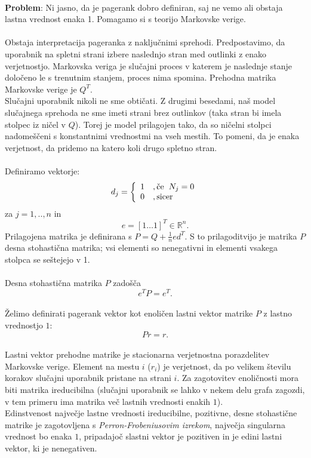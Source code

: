 \documentclass[a4paper]{article}
\begin{document}
\\ \textbf{Problem}: Ni jasno, da je pagerank dobro definiran, saj ne vemo ali obstaja lastna vrednost enaka 1. Pomagamo si s teorijo Markovske verige.\\
\\Obstaja interpretacija pageranka z naključnimi sprehodi. Predpostavimo, da uporabnik na spletni strani izbere naslednjo stran  med outlinki z enako verjetnostjo. Markovska veriga je slučajni proces v katerem je naslednje stanje določeno le s trenutnim stanjem, proces nima spomina. Prehodna matrika Markovske verige je $Q^T$.\\
Slučajni uporabnik nikoli ne sme obtičati. Z drugimi besedami, naš model slučajnega sprehoda ne sme imeti strani brez outlinkov (taka stran bi imela stolpec iz ničel v $Q$). Torej je model prilagojen tako, da so ničelni stolpci nadomeščeni s konstantnimi vrednostmi na vseh mestih. To pomeni, da je enaka verjetnost, da pridemo na katero koli drugo spletno stran. \\ 
\\Definiramo vektorje: \\
\[
d_j = 
\left \{
	\begin{array}{ll}
		1  &, \mbox{če}\hspace{2mm} N_j = 0 \\
		0 &, \mbox{sicer} 
	\end{array}
\right. \]
za $j = 1, .., n$ in
$$e = [1 … 1] ^T \in \mathbb{R}^n.$$
Prilagojena matrika je definirana s $ P = Q + \frac{1}{n}ed^T$. 
S to prilagoditvijo je matrika $P$ desna stohastična matrika; vsi elementi so nenegativni in elementi vsakega stolpca se seštejejo v 1. \\
\\Desna stohastična matrika $P$ zadošča 
$$e^TP = e^T.$$ \\
Želimo definirati pagerank vektor kot enoličen lastni vektor matrike $P$ z lastno vrednostjo $1$:
$$Pr=r.$$ \\
Lastni vektor prehodne matrike je stacionarna verjetnostna porazdelitev Markovske verige. Element na mestu $i$ ($r_i$) je verjetnost, da po velikem številu korakov slučajni uporabnik pristane na strani $i$. Za zagotovitev enoličnosti mora biti matrika ireducibilna (slučajni uporabnik se lahko v nekem delu grafa zagozdi, v tem primeru ima matrika več lastnih vrednosti enakih $1$). \\ Edinstvenost največje lastne vrednosti ireducibilne, pozitivne, desne stohastične matrike je zagotovljena s \textit{Perron-Frobeniusovim izrekom}, največja singularna vrednost bo enaka $1$, pripadajoč slastni vektor je pozitiven in je edini lastni vektor, ki je nenegativen. \\
\end{document}
